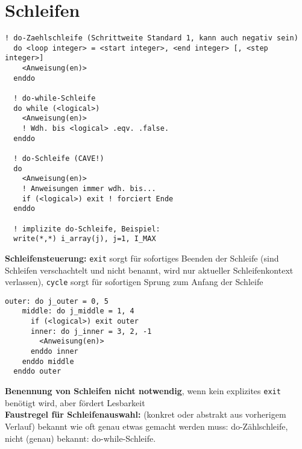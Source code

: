\documentclass[a4paper, twocolumn]{scrarticle}
\begin{document}
\section{Schleifen}
\begin{lstlisting}[caption={\bfseries do-Schleifen}]
  ! do-Zaehlschleife (Schrittweite Standard 1, kann auch negativ sein)
  do <loop integer> = <start integer>, <end integer> [, <step integer>]
    <Anweisung(en)>
  enddo
  
  ! do-while-Schleife
  do while (<logical>)
    <Anweisung(en)>
    ! Wdh. bis <logical> .eqv. .false.
  enddo
  
  ! do-Schleife (CAVE!)
  do
    <Anweisung(en)>
    ! Anweisungen immer wdh. bis...
    if (<logical>) exit ! forciert Ende
  enddo
  
  ! implizite do-Schleife, Beispiel:
  write(*,*) i_array(j), j=1, I_MAX
\end{lstlisting}
\textbf{Schleifensteuerung:} \lstinline|exit| sorgt für sofortiges Beenden der Schleife (sind Schleifen verschachtelt und nicht benannt, wird nur aktueller Schleifenkontext verlassen), \lstinline|cycle| sorgt für sofortigen Sprung zum Anfang der Schleife 
\begin{lstlisting}[caption={\bfseries Beispiel: Benannte do-Schleifen und explizites exit}]
  outer: do j_outer = 0, 5
    middle: do j_middle = 1, 4
      if (<logical>) exit outer
      inner: do j_inner = 3, 2, -1
        <Anweisung(en)>
      enddo inner
    enddo middle
  enddo outer
\end{lstlisting}
\textbf{Benennung von Schleifen nicht notwendig}, wenn kein explizites \lstinline|exit| benötigt wird, aber fördert Lesbarkeit\\
\textbf{Faustregel für Schleifenauswahl:} (konkret oder abstrakt aus vorherigem Verlauf) bekannt wie oft genau etwas gemacht werden muss: do-Zählschleife, nicht (genau) bekannt: do-while-Schleife.
\end{document}
